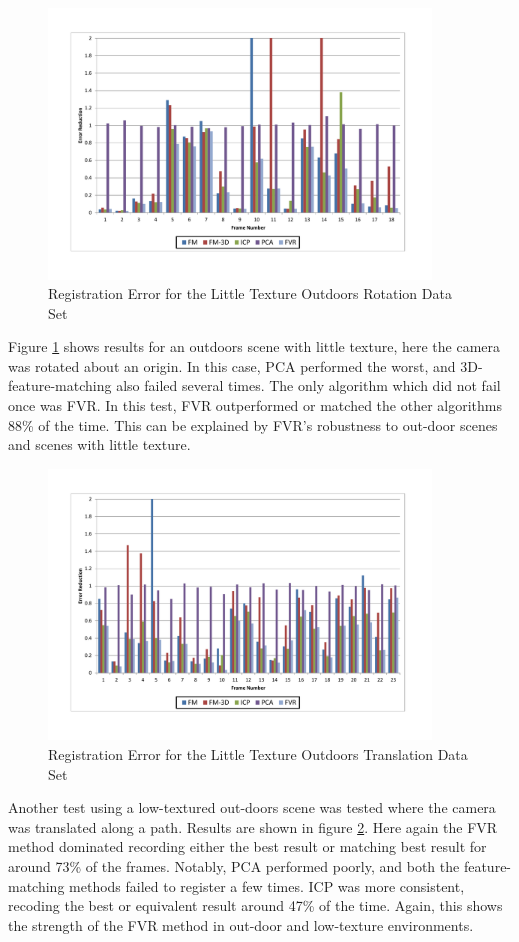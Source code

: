 \begin{figure}[!htb]
\centering
\includegraphics[width=4.0in]{images/results/Outside_No_Texture_Rotation}
\caption{Registration Error for the Little Texture Outdoors Rotation Data Set}
\label{fig:PET13}
\end{figure}

Figure \ref{fig:PET13} shows results for an outdoors scene with little texture, here the camera was rotated about an origin. In this case, PCA performed the worst, and 3D-feature-matching also failed several times. The only algorithm which did not fail once was FVR. In this test, FVR outperformed or matched the other algorithms 88\% of the time. This can be explained by FVR's robustness to out-door scenes and scenes with little texture.  \\

\begin{figure}[!htb]
\centering
\includegraphics[width=4.0in]{images/results/Outside_No_Texture_Translation}
\caption{Registration Error for the Little Texture Outdoors Translation Data Set}
\label{fig:PET14}
\end{figure}

Another test using a low-textured out-doors scene was tested where the camera was translated along a path. Results are shown in figure \ref{fig:PET14}. Here again the FVR method dominated recording either the best result or matching best result for around 73\% of the frames. Notably, PCA performed poorly, and both the feature-matching methods failed to register a few times. ICP was more consistent, recoding the best or equivalent result around 47\% of the time. Again, this shows the strength of the FVR method in out-door and low-texture environments. 

